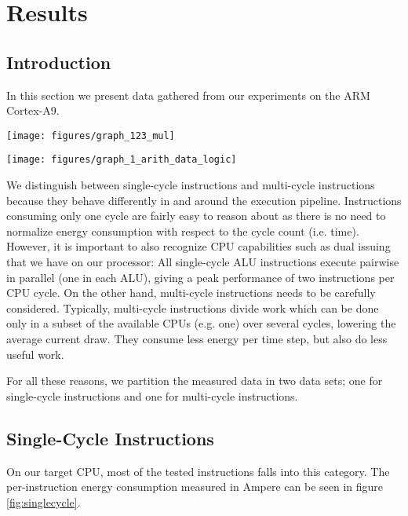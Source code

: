 \section{Results}

\subsection{Introduction}
In this section we present data gathered from our experiments on the ARM
Cortex-A9.

\begin{figure*}[ht]
    \centering
    \texttt{[image: figures/graph\_123\_mul]}
    \caption{Single Cycle energy consumption}
    \label{fig:allmul}
\end{figure*}

\begin{figure*}[ht]
    \centering
    \texttt{[image: figures/graph\_1\_arith\_data\_logic]}
    \caption{Single Cycle energy consumption}
    \label{fig:singlecycle}
\end{figure*}

We distinguish between single-cycle instructions and multi-cycle instructions
because they behave differently in and around the execution pipeline.
Instructions consuming only one cycle are fairly easy to reason about as there
is no need to normalize energy consumption with respect to the cycle count (i.e.
time). However, it is important to also recognize CPU capabilities such as dual
issuing that we have on our processor: All single-cycle ALU instructions execute
pairwise in parallel (one in each ALU), giving a peak performance of two
instructions per CPU cycle. On the other hand, multi-cycle instructions needs to
be carefully considered. Typically, multi-cycle instructions divide work which
can be done only in a subset of the available CPUs (e.g. one) over several
cycles, lowering the average current draw. They consume less energy per
time step, but also do less useful work.

For all these reasons, we partition the measured data in two data sets; one for
single-cycle instructions and one for multi-cycle instructions.

\subsection{Single-Cycle Instructions}
On our target CPU, most of  the tested instructions falls into
this category. The per-instruction energy consumption measured in Ampere can be
seen in figure \ref{fig:singlecycle}.

